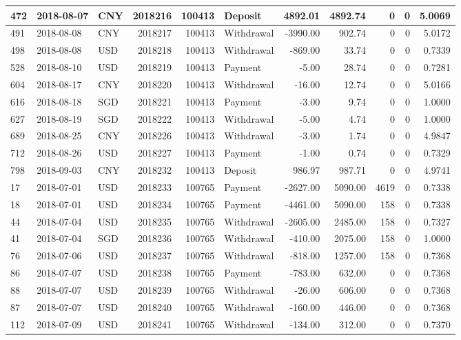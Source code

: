 \documentclass[]{article}
\begin{document}
\begin{table}[H]
\begin{tabular}{l|l|l|r|r|l|r|r|r|r|r}
472 & 2018-08-07 & CNY & 2018216 & 100413 & Deposit & 4892.01 & 4892.74 & 0 & 0 & 5.0069\\
\hline
491 & 2018-08-08 & CNY & 2018217 & 100413 & Withdrawal & -3990.00 & 902.74 & 0 & 0 & 5.0172\\
\hline
498 & 2018-08-08 & USD & 2018218 & 100413 & Withdrawal & -869.00 & 33.74 & 0 & 0 & 0.7339\\
\hline
528 & 2018-08-10 & USD & 2018219 & 100413 & Payment & -5.00 & 28.74 & 0 & 0 & 0.7281\\
\hline
604 & 2018-08-17 & CNY & 2018220 & 100413 & Withdrawal & -16.00 & 12.74 & 0 & 0 & 5.0166\\
\hline
616 & 2018-08-18 & SGD & 2018221 & 100413 & Payment & -3.00 & 9.74 & 0 & 0 & 1.0000\\
\hline
627 & 2018-08-19 & SGD & 2018222 & 100413 & Withdrawal & -5.00 & 4.74 & 0 & 0 & 1.0000\\
\hline
689 & 2018-08-25 & CNY & 2018226 & 100413 & Withdrawal & -3.00 & 1.74 & 0 & 0 & 4.9847\\
\hline
712 & 2018-08-26 & USD & 2018227 & 100413 & Payment & -1.00 & 0.74 & 0 & 0 & 0.7329\\
\hline
798 & 2018-09-03 & CNY & 2018232 & 100413 & Deposit & 986.97 & 987.71 & 0 & 0 & 4.9741\\
\hline
17 & 2018-07-01 & USD & 2018233 & 100765 & Payment & -2627.00 & 5090.00 & 4619 & 0 & 0.7338\\
\hline
18 & 2018-07-01 & USD & 2018234 & 100765 & Payment & -4461.00 & 5090.00 & 158 & 0 & 0.7338\\
\hline
44 & 2018-07-04 & USD & 2018235 & 100765 & Withdrawal & -2605.00 & 2485.00 & 158 & 0 & 0.7327\\
\hline
41 & 2018-07-04 & SGD & 2018236 & 100765 & Withdrawal & -410.00 & 2075.00 & 158 & 0 & 1.0000\\
\hline
76 & 2018-07-06 & USD & 2018237 & 100765 & Withdrawal & -818.00 & 1257.00 & 158 & 0 & 0.7368\\
\hline
86 & 2018-07-07 & USD & 2018238 & 100765 & Payment & -783.00 & 632.00 & 0 & 0 & 0.7368\\
\hline
88 & 2018-07-07 & USD & 2018239 & 100765 & Withdrawal & -26.00 & 606.00 & 0 & 0 & 0.7368\\
\hline
87 & 2018-07-07 & USD & 2018240 & 100765 & Withdrawal & -160.00 & 446.00 & 0 & 0 & 0.7368\\
\hline
112 & 2018-07-09 & USD & 2018241 & 100765 & Withdrawal & -134.00 & 312.00 & 0 & 0 & 0.7370\\

\end{tabular}
\end{table}
\end{document}
